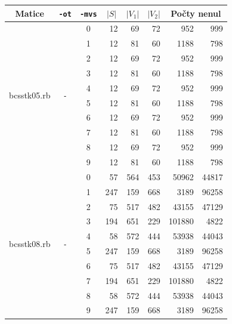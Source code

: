 \documentclass{ctuthesis}
\theoremstyle{plain}
\theoremstyle{definition}
\begin{document}
\bigskip
{\noindent
  \footnotesize
  \centering
  \renewcommand{\arraystretch}{1.1}
\begin{tabular}{|l|c|c|r|r|r|r|r|}
  \hline
  \multicolumn{1}{|c|}{Matice} & \multicolumn{1}{|c|}{\texttt{-ot}}  &\multicolumn{1}{|c|}{\texttt{-mvs}} &\multicolumn{1}{|c|}{$|S|$} & \multicolumn{1}{|c|}{$|V_1|$}& \multicolumn{1}{|c|}{$|V_2|$} & \multicolumn{2}{c|}{Počty nenul} \\
  \hline
    \multirow{10}{*}{bcsstk05.rb}
      & \multirow{10}{*}{\texttt{-}} & 0
      & 12	&	69	&	72	& 952 & 999 \\
      & & 1 
      &	12	&	81	&	60	&	1188	&	798	\\
      & & 2
      &	12	&	69	&	72	&	952	&	999	\\
      & & 3
      &	12	&	81	&	60	&	1188	&	798	\\
      & & 4
      &	12	&	69	&	72	&	952	&	999	\\
      & & 5
      &	12	&	81	&	60	&	1188	&	798	\\
      & & 6
      &	12	&	69	&	72	&	952	&	999	\\
      & & 7
      &	12	&	81	&	60	&	1188	&	798	\\
      & & 8
      &	12	&	69	&	72	&	952	&	999	\\
      & & 9
      &	12	&	81	&	60	&	1188	&	798	\\
    \hline
    \multirow{10}{*}{bcsstk08.rb}
      & \multirow{10}{*}{\texttt{-}} & 0
      & 57  & 564 & 453 &	50962	&	44817 \\
      & & 1 
      &	247	&	159	&	668	&	3189	&	96258	\\
      & & 2
      &	75	&	517	&	482	&	43155	&	47129	\\
      & & 3
      &	194	&	651	&	229	&	101880	&	4822	\\
      & & 4
      &	58	&	572	&	444	&	53938	&	44043	\\
      & & 5
      &	247	&	159	&	668	&	3189	&	96258	\\
      & & 6
      &	75	&	517	&	482	&	43155	&	47129	\\
      & & 7
      &	194	&	651	&	229	&	101880	&	4822	\\
      & & 8
      &	58	&	572	&	444	&	53938	&	44043	\\
      & & 9
      &	247	&	159	&	668	&	3189	&	96258	\\
  \hline
\end{tabular}
}
\bigskip
\end{document}
